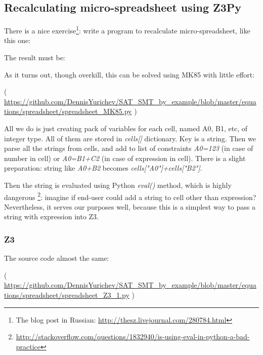 \subsection{Recalculating micro-spreadsheet using Z3Py}

\renewcommand{\CURPATH}{equations/spreadsheet}

There is a nice exercise\footnote{The blog post in Russian: \url{http://thesz.livejournal.com/280784.html}}:
write a program to recalculate micro-spreadsheet, like this one:



The result must be:



As it turns out, though overkill, this can be solved using MK85 with little effort:



( \url{https://github.com/DennisYurichev/SAT_SMT_by_example/blob/master/equations/spreadsheet/spreadsheet_MK85.py} )

All we do is just creating pack of variables for each cell, named A0, B1, etc, of integer type.
All of them are stored in \textit{cells[]} dictionary.
Key is a string.
Then we parse all the strings from cells, and add to list of constraints \textit{A0=123}
(in case of number in cell) or \textit{A0=B1+C2} (in case of expression in cell).
There is a slight preparation: string like \textit{A0+B2} becomes \textit{cells["A0"]+cells["B2"]}.

Then the string is evaluated using Python \textit{eval()} method,
which is highly dangerous
\footnote{\url{http://stackoverflow.com/questions/1832940/is-using-eval-in-python-a-bad-practice}}:
imagine if end-user could add a string to cell other than expression?
Nevertheless, it serves our purposes well, because this is a simplest way to pass a string with expression into Z3.

\subsubsection{Z3}

The source code almost the same:



( \url{https://github.com/DennisYurichev/SAT_SMT_by_example/blob/master/equations/spreadsheet/spreadsheet_Z3_1.py} )

